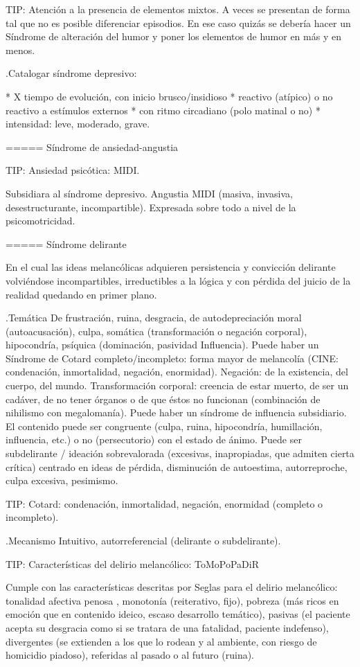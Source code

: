 TIP: Atención a la presencia de elementos mixtos. A veces se presentan de forma tal que no es posible diferenciar episodios. En ese caso quizás se debería hacer un Síndrome de alteración del humor y poner los elementos de humor en más y en menos.

.Catalogar síndrome depresivo:

* X tiempo de evolución, con inicio brusco/insidioso
* reactivo (atípico) o no reactivo a estímulos externos
* con ritmo circadiano (polo matinal o no)
* intensidad: leve, moderado, grave.


===== Síndrome de ansiedad-angustia

TIP: Ansiedad psicótica: MIDI.

Subsidiara al síndrome depresivo. Angustia MIDI (masiva, invasiva, desestructurante, incompartible). Expresada sobre todo a nivel de la psicomotricidad.

===== Síndrome delirante

En el cual las ideas melancólicas adquieren persistencia y convicción delirante volviéndose incompartibles, irreductibles a la lógica y con pérdida del juicio de la realidad quedando en primer plano.

.Temática
De frustración, ruina, desgracia, de autodepreciación moral (autoacusación), culpa, somática (transformación o negación corporal), hipocondría, psíquica (dominación, pasividad Influencia). Puede haber un Síndrome de Cotard completo/incompleto: forma mayor de melancolía (CINE: condenación, inmortalidad, negación, enormidad). Negación: de la existencia, del cuerpo, del mundo. Transformación corporal: creencia de estar muerto, de ser un cadáver, de no tener órganos o de que éstos no funcionan (combinación de nihilismo con megalomanía).
Puede haber un síndrome de influencia subsidiario.
El contenido puede ser congruente (culpa, ruina, hipocondría, humillación, influencia, etc.) o no (persecutorio) con el estado de ánimo.
Puede ser subdelirante / ideación sobrevalorada (excesivas, inapropiadas, que admiten cierta crítica) centrado en ideas de pérdida, disminución de autoestima, autorreproche, culpa excesiva, pesimismo.

TIP: Cotard: condenación, inmortalidad, negación, enormidad (completo o incompleto).

.Mecanismo
Intuitivo, autorreferencial (delirante o subdelirante).

TIP: Características del delirio melancólico: ToMoPoPaDiR

Cumple con las características descritas por Seglas para el delirio melancólico: tonalidad afectiva penosa , monotonía (reiterativo, fijo), pobreza (más ricos en emoción que en contenido ideico, escaso desarrollo temático), pasivas (el paciente acepta su desgracia como si se tratara de una fatalidad, paciente indefenso), divergentes (se extienden a los que lo rodean y al ambiente, con riesgo de homicidio piadoso), referidas al pasado o al futuro (ruina).

